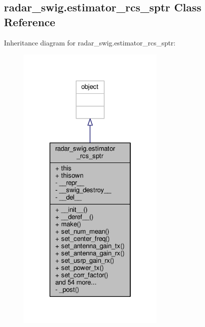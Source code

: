 \subsection{radar\+\_\+swig.\+estimator\+\_\+rcs\+\_\+sptr Class Reference}
\label{classradar__swig_1_1estimator__rcs__sptr}


Inheritance diagram for radar\+\_\+swig.\+estimator\+\_\+rcs\+\_\+sptr\+:
\nopagebreak
\begin{figure}[H]
\begin{center}
\leavevmode
\includegraphics[width=202pt]{d7/dcc/classradar__swig_1_1estimator__rcs__sptr__inherit__graph}
\end{center}
\end{figure}


